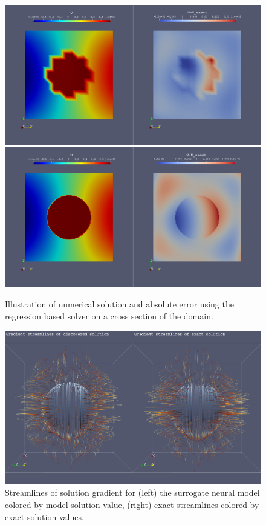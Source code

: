 \documentclass{elsarticle}
\begin{document}
\begin{figure}
	\centering
	\includegraphics[width=\linewidth]{./figures/sphere_sols_regression_16x16x16.png}
	\includegraphics[width=\linewidth]{./figures/sphere_sols_regression_128x128x128.png}
	\caption{Illustration of numerical solution and absolute error using the regression based solver on a cross section of the domain. }
	\label{fig:sphere}
\end{figure}


\begin{figure}
	\centering
	\includegraphics[width=\linewidth]{./figures/128x128x128_electric_U.png}
	\caption{Streamlines of solution gradient for (left) the surrogate neural model colored by model solution value, (right) exact streamlines colored by exact solution values.  }
	\label{fig:spheregrad}
\end{figure}
\end{document}
